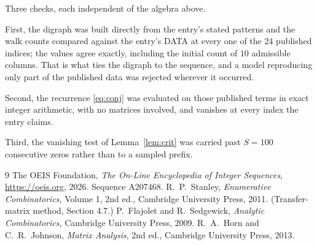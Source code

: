 \documentclass[11pt,a4paper]{article}
\theoremstyle{plain}
\theoremstyle{definition}
\begin{document}
Three checks, each independent of the algebra above.

First, the digraph was built directly from the entry's stated patterns and the walk counts
compared against the entry's DATA at every one of the $24$ published indices; the
values agree exactly, including the initial count of $10$ admissible columns. That is
what ties the digraph to the sequence, and a model reproducing only part of the published
data was rejected wherever it occurred.

Second, the recurrence \eqref{eq:conj} was evaluated on those published terms in exact
integer arithmetic, with no matrices involved, and vanishes at every index the entry claims.

Third, the vanishing test of Lemma~\ref{lem:crit} was carried past $S=100$ consecutive
zeros rather than to a sampled prefix.

\begin{thebibliography}{9}
 The OEIS Foundation, \emph{The On-Line Encyclopedia of Integer
Sequences}, \url{https://oeis.org}, 2026. Sequence A207468.
 R.~P.~Stanley, \emph{Enumerative Combinatorics}, Volume 1, 2nd ed.,
Cambridge University Press, 2011. (Transfer-matrix method, Section 4.7.)
 P.~Flajolet and R.~Sedgewick, \emph{Analytic Combinatorics}, Cambridge
University Press, 2009.
 R.~A.~Horn and C.~R.~Johnson, \emph{Matrix Analysis}, 2nd ed., Cambridge
University Press, 2013.
\end{thebibliography}
\end{document}

